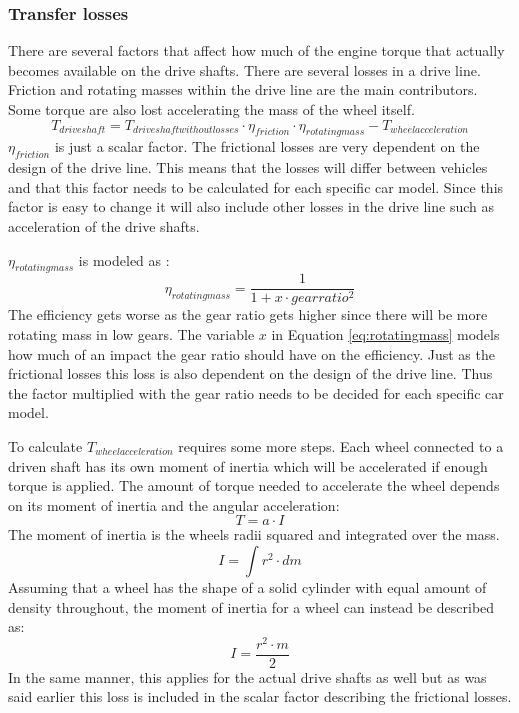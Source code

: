 \subsubsection{Transfer losses}
There are several factors that affect how much of the engine torque that actually becomes available on the drive shafts. There are several losses in a drive line. Friction and rotating masses within the drive line are the main contributors. Some torque are also lost accelerating the mass of the wheel itself.
\begin{equation}
T_{driveshaft} = T_{driveshaftwithoutlosses}\cdot\eta_{friction}\cdot\eta_{rotating mass} - T_{wheelacceleration}
\end{equation}
$ \eta_{friction} $ is just a scalar factor. The frictional losses are very dependent on the design of the drive line. This means that the losses will differ between vehicles and that this factor needs to be calculated for each specific car model. Since this factor is easy to change it will also include other losses in the drive line such as acceleration of the drive shafts. 

$ \eta_{rotating mass} $ is modeled as \cite{mason}:
\begin{equation} \label{eq:rotatingmass}
	\eta_{rotating mass} = \frac{1}{1 + x\cdot gearratio^2}
\end{equation}
The efficiency gets worse as the gear ratio gets higher since there will be more rotating mass in low gears. The variable $ x $ in Equation \ref{eq:rotatingmass} models how much of an impact the gear ratio should have on the efficiency. Just as the frictional losses this loss is also dependent on the design of the drive line. Thus the factor multiplied with the gear ratio needs to be decided for each specific car model.

To calculate $ T_{wheelacceleration} $ requires some more steps. Each wheel connected to a driven shaft has its own moment of inertia which will be accelerated if enough torque is applied. The amount of torque needed to accelerate the wheel depends on its moment of inertia and the angular acceleration:
\begin{equation}
	T = a \cdot I
\end{equation}
The moment of inertia is the wheels radii squared and integrated over the mass. 
\begin{equation}
	I = \int r^2 \cdot dm
\end{equation}
Assuming that a wheel has the shape of a solid cylinder with equal amount of density throughout, the moment of inertia for a wheel can instead be described as:
\begin{equation}
	I = \dfrac{r^2 \cdot m}{2} 
\end{equation}
In the same manner, this applies for the actual drive shafts as well but as was said earlier this loss is included in the scalar factor describing the frictional losses.

